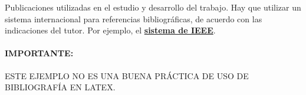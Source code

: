 \begin{thebibliography}{99}
 Publicaciones utilizadas en el estudio y desarrollo del trabajo.
Hay que utilizar un sistema internacional para referencias bibliográficas, de acuerdo con las indicaciones del tutor. Por ejemplo, el \href{https://www.etsiinf.upm.es/docs/estudios/grado/1475_ieeecitationref.pdf}{\textbf{sistema de IEEE}}.


\end{thebibliography}

\paragraph*{IMPORTANTE:} ESTE EJEMPLO NO ES UNA BUENA PRÁCTICA DE USO DE BIBLIOGRAFÍA EN LATEX.


